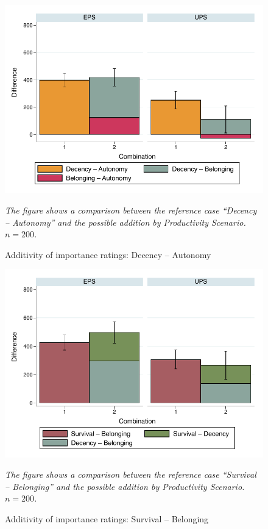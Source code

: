 \documentclass[egregdoesnotlikesansseriftitles]{scrartcl}
\begin{document}
\begin{figure}[ht!]
   \centering
   \includegraphics[width=.75\textwidth]{figures/figure_7.pdf}
   \begin{minipage}{0.75\linewidth}
   \footnotesize
   \emph{The figure shows a comparison between the reference case ``Decency -- Autonomy'' and the possible addition by Productivity Scenario. $n = 200$.}
   \end{minipage}	
   \caption{Additivity of importance ratings: Decency -- Autonomy}
   \label{fig:additivity_sub_1}
\end{figure}

\begin{figure}[ht!]
   \centering
   \includegraphics[width=.75\textwidth]{figures/figure_8.pdf}
   \begin{minipage}{0.75\linewidth}
   \footnotesize
   \emph{The figure shows a comparison between the reference case ``Survival -- Belonging'' and the possible addition by Productivity Scenario. $n = 200$.}
   \end{minipage}	
   \caption{Additivity of importance ratings: Survival -- Belonging}
   \label{fig:additivity_sub_2}
\end{figure}
\end{document}
